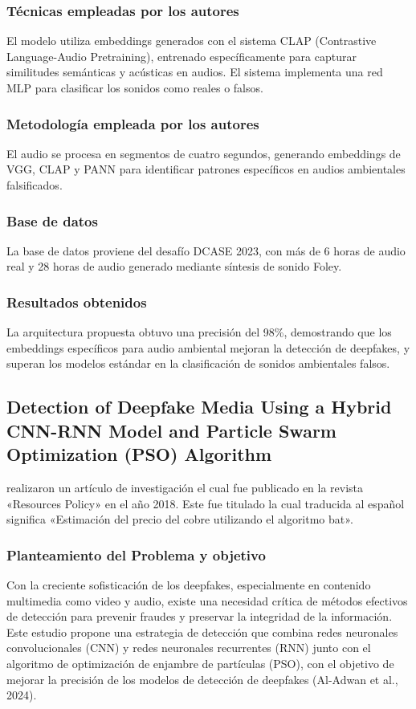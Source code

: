 \subsubsection{Técnicas empleadas por los autores}
El modelo utiliza embeddings generados con el sistema CLAP (Contrastive Language-Audio Pretraining), entrenado específicamente para capturar similitudes semánticas y acústicas en audios. El sistema implementa una red MLP para clasificar los sonidos como reales o falsos.

\subsubsection{Metodología empleada por los autores}
El audio se procesa en segmentos de cuatro segundos, generando embeddings de VGG, CLAP y PANN para identificar patrones específicos en audios ambientales falsificados.

\subsubsection{Base de datos}
La base de datos proviene del desafío DCASE 2023, con más de 6 horas de audio real y 28 horas de audio generado mediante síntesis de sonido Foley.

\subsubsection{Resultados obtenidos}
La arquitectura propuesta obtuvo una precisión del 98\%, demostrando que los embeddings específicos para audio ambiental mejoran la detección de deepfakes, y superan los modelos estándar en la clasificación de sonidos ambientales falsos.

\subsection{Detection of Deepfake Media Using a Hybrid CNN-RNN Model and Particle Swarm Optimization (PSO) Algorithm \citep*{pr_dehghani2018copper}}
\citeauthor{pr_dehghani2018copper} realizaron un artículo de investigación el cual fue publicado en la revista «Resources Policy» en el año 2018. Este fue titulado  la cual traducida al español significa «Estimación del precio del cobre utilizando el algoritmo bat».

\subsubsection{Planteamiento del Problema y objetivo }
Con la creciente sofisticación de los deepfakes, especialmente en contenido multimedia como video y audio, existe una necesidad crítica de métodos efectivos de detección para prevenir fraudes y preservar la integridad de la información. Este estudio propone una estrategia de detección que combina redes neuronales convolucionales (CNN) y redes neuronales recurrentes (RNN) junto con el algoritmo de optimización de enjambre de partículas (PSO), con el objetivo de mejorar la precisión de los modelos de detección de deepfakes (Al-Adwan et al., 2024).

